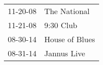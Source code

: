 \begin{supertabular}{p{0.25\columnwidth}p{0.75\columnwidth}}
 11-20-08 &    The National \\
 11-21-08 &       9:30 Club \\
 08-30-14 &  House of Blues \\
 08-31-14 &     Jannus Live \\
\end{supertabular}
